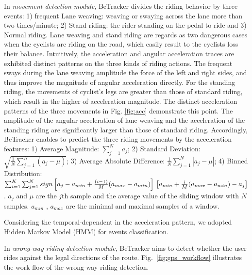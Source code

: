 \documentclass{sigchi-ext}
\def\sysname{BeTracker }
\begin{document}
In \textit{movement detection module}, \sysname divides the riding behavior by three events: 1) frequent Lane weaving: weaving or swaying across the lane more than two times/minute;  2) Stand riding: the rider standing on the pedal to ride and 3) Normal riding. 
Lane weaving and stand riding are regards as two dangerous cases when the cyclists are riding on the road, which easily result to the cyclists loss their balance.
Intuitively, the acceleration and angular acceleration traces are exhibited distinct patterns on the three kinds of riding actions. The frequent sways during the lane weaving amplitude the force of the left and right sides, and thus improve the magnitude of angular acceleration directly. For the standing riding, the movements of cyclist's legs are greater than those of standard riding, which result in the higher of acceleration magnitude.
The distinct acceleration patterns of the three movements in Fig. \ref{fig:acc} demonstrate this point. The amplitude of the angular acceleration of lane weaving and the acceleration of the standing riding  are significantly larger than those of standard riding.  Accordingly, \sysname enables to predict the three riding movements by the acceleration features:
1) Average Magnitude:  $\sum_{j=1}^{N}a_{j}$;
2) Standard Deviation:  $\sqrt{\frac{1}{N}\sum_{j=1}^{N}(a_{j}-\mu )}$;
3) Average Absolute Difference:  $\frac{1}{N}\sum_{j=1}^{N}\left |a_{j}-\mu   \right |$;
4) Binned Distribution: $\sum_{i=1}^{K}\sum_{j=1}^{N} sign\left [a_{j}-a_{min}+\frac{(i-1)}{M}(a_{max}-a_{min})\right ]\\\left [a_{min}+\frac{i}{M}(a_{max}-a_{min}) -a_j \right ]$.  $a_{j}$ and $\mu$ are the $j$th sample and the average value of the sliding window with $N$ samples.  $a_{min}$ , $a_{max}$ are the minimal and maximal samples of a window.

Considering the temporal-dependent in the acceleration pattern, we adopted Hidden Markov Model (HMM) for events classification.


In \textit{wrong-way riding detection module}, \sysname aims to detect whether the user rides against the legal directions of the route.
Fig.~\ref{fig:gps_workflow} illustrates the work flow of the wrong-way riding detection. 
\end{document}

